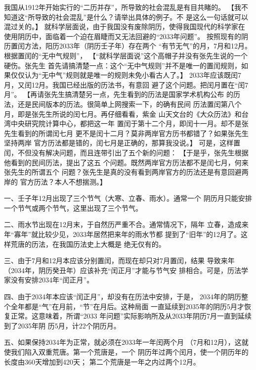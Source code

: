 \fangsong
我国从1912年开始实行的“二历并存”，所导致的社会混乱是有目共睹的。
\normalfont
【我不知道这“所导致的社会混乱”是什么？请举出具体的例子。不
是这么一句话就可以混过关的。】
\fangsong
就科学层面说，由于我国没有废除阴历，使得我国现代的科学家在
使用阴历中，面临着一个迫在眉睫而又无法回避的“2033年问题”。
按照现有的阴历置闰方法，阳历2033年（阴历壬子年）存在两个
“有节无气”的月，7月和12月。根据置闰的“无中气规则”，
\normalfont
【“就科学层面说”这个高帽子并没有张先生说的一个硬伤。张先生
首先请搞清楚一点：这个“无中气规则”并不是唯一的置闰规则，如
果仅仅认为“无中气”规则就是唯一的规则未免小看古人了。】
\fangsong
2033年应该既闰7月，又闰12月。我国已经出版的历法书，有意回
避了这个问题。把闰月置在“闰7月”。
\normalfont
【再请张先生搞清楚另一点，先生看到的历法是国家学术机构公布
的历法，还是民间版本的历法。很简单上网搜索一下，的确有民间
历法置闰第八个月，即是张先生所说的闰七月。再仔细看看，紫金
山天文台的《大众历法》和台湾中央研究院计算中心，都把这一年
置闰于第十二个月，即闰十一月。却不是张先生看到的所谓闰七月
更不是闰十二月？莫非两岸官方历书都错了？如果张先生坚持两岸
官方历法都是错的，闰七月是正确的，那算我没说。】
\fangsong
可是，这样置闰，不但没有解决问题，而且连带引出了五个新的问题：
\normalfont【于是乎，张先生根据他看到的民间历法，提出了这五
个问题。既然两岸官方历法都不是闰七月，何来张先生的所谓五个
问题？张先生是真的没有看到两岸官方的历法还是有意回避两岸的
官方历法？本人不想揣测。】\fangsong

一、壬子年12月出现了三个节气（大寒、立春、雨水）。通常一个
阴历月只能安排一个节气或两个节气，这里出现了三个节气。

二、雨水节出现在12月末，于自然历严重不合。通常情况下，隔年
立春，造成来年“寡年”就比较少见，2033年居然把来年的雨水节都
提到了“旧年”的12月了。这样荒唐的历法，在我国历法史上大概是
绝无仅有的。

三、由于7月和12月本应该分别置闰，而现在却只对7月置闰，结果
导致来年（2034年，阴历癸丑年）应该补充“闰正月”才能与节气安
排相合。可是，历法学家没有安排2034年“闰正月”。

四、由于2034年本应该“闰正月”，却没有在历法中安排，于是，
2034年的阴历整个全年都是“气”在月前，“节”在月后。这种局面
一直延续到2035年的阴历5月才恢复正常。这意味着，所谓“2033
年问题”实际影响所及从2033年阴历7月一直到延续到了2035年阴
历5月，计22个阴历月。

五、如果保持2034年为正常，就必须在2033年一年闰两个月
（7月和12月），这就使我们陷入双重荒唐。第一个荒唐是，一个
阴历年过两个闰月，使一个阴历年的长度由360天增加到420天；
第二个荒唐是一年之内过两个12月。

